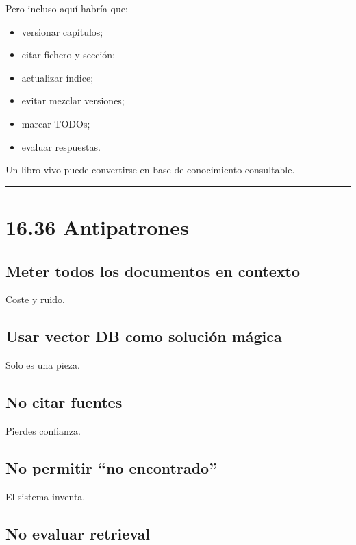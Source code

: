 Pero incluso aquí habría que:

\begin{itemize}
\tightlist
\item
  versionar capítulos;
\item
  citar fichero y sección;
\item
  actualizar índice;
\item
  evitar mezclar versiones;
\item
  marcar TODOs;
\item
  evaluar respuestas.
\end{itemize}

Un libro vivo puede convertirse en base de conocimiento consultable.

\begin{center}\rule{0.5\linewidth}{0.5pt}\end{center}

\section{16.36 Antipatrones}\label{antipatrones-5}

\subsection{Meter todos los documentos en
contexto}\label{meter-todos-los-documentos-en-contexto}

Coste y ruido.

\subsection{Usar vector DB como solución
mágica}\label{usar-vector-db-como-soluciuxf3n-muxe1gica}

Solo es una pieza.

\subsection{No citar fuentes}\label{no-citar-fuentes}

Pierdes confianza.

\subsection{No permitir ``no
encontrado''}\label{no-permitir-no-encontrado}

El sistema inventa.

\subsection{No evaluar retrieval}\label{no-evaluar-retrieval}


